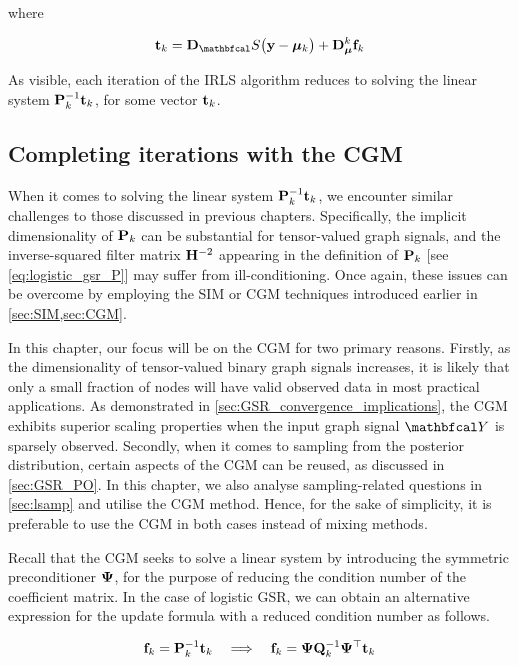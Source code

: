 where

\begin{equation}
    \tee_k = \D_\St \big(\y - \muu_k\big) + \D_{\muu}^k \f_k
\end{equation}

As visible, each iteration of the IRLS algorithm reduces to solving the linear system $\mathbf{P}^{-1}_k \mathbf{t}_k$, for some vector $\mathbf{t}_k$. 

\subsection{Completing iterations with the CGM}

When it comes to solving the linear system $\mathbf{P}^{-1}_k \mathbf{t}_k$, we encounter similar challenges to those discussed in previous chapters. Specifically, the implicit dimensionality of $\mathbf{P}_k$ can be substantial for tensor-valued graph signals, and the inverse-squared filter matrix $\mathbf{H}^{-2}$ appearing in the definition of $\mathbf{P}_k$ [see \cref{eq:logistic_gsr_P}] may suffer from ill-conditioning. Once again, these issues can be overcome by employing the SIM or CGM techniques introduced earlier in \cref{sec:SIM,sec:CGM}.


In this chapter, our focus will be on the CGM for two primary reasons. Firstly, as the dimensionality of tensor-valued binary graph signals increases, it is likely that only a small fraction of nodes will have valid observed data in most practical applications. As demonstrated in \cref{sec:GSR_convergence_implications}, the CGM exhibits superior scaling properties when the input graph signal $\Yt$ is sparsely observed. Secondly, when it comes to sampling from the posterior distribution, certain aspects of the CGM can be reused, as discussed in \cref{sec:GSR_PO}. In this chapter, we also analyse sampling-related questions in \cref{sec:lsamp} and utilise the CGM method. Hence, for the sake of simplicity, it is preferable to use the CGM in both cases instead of mixing methods.

Recall that the CGM seeks to solve a linear system by introducing the symmetric preconditioner $\mathbf{\Psi}$, for the purpose of reducing the condition number of the coefficient matrix. In the case of logistic GSR, we can obtain an alternative expression for the update formula with a reduced condition number as follows. 

\begin{equation*}
    \mathbf{f}_k = \mathbf{P}^{-1}_k \mathbf{t}_k \quad \Longrightarrow \quad \mathbf{f}_k = \mathbf{\Psi} \mathbf{Q}_k^{-1} \mathbf{\Psi}^\top \mathbf{t}_k
\end{equation*}

